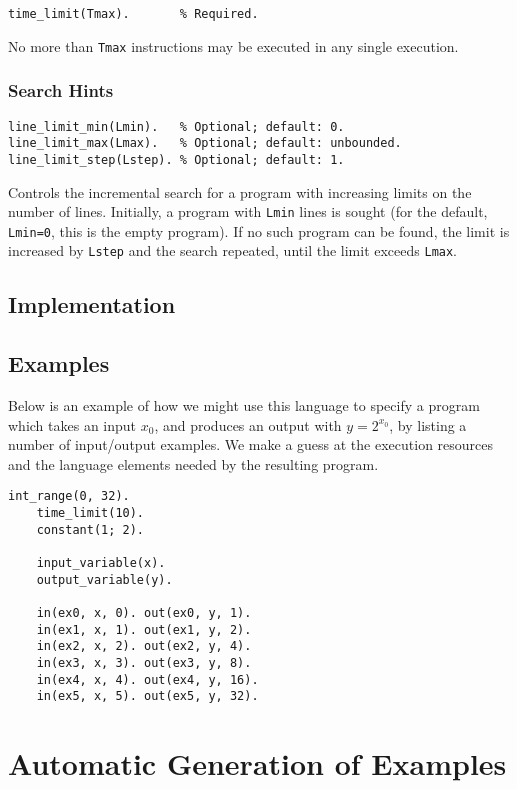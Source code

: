 \documentclass[a4paper,twoside,notitlepage]{report}
\newcommand{\ttt}{\texttt}
\begin{document}
\begin{Verbatim}[samepage=true]
time_limit(Tmax).       % Required.
\end{Verbatim}
No more than \ttt{Tmax} instructions may be executed in any single execution.

\subsection{Search Hints}
\begin{Verbatim}[samepage=true]
line_limit_min(Lmin).   % Optional; default: 0.
line_limit_max(Lmax).   % Optional; default: unbounded.
line_limit_step(Lstep). % Optional; default: 1.
\end{Verbatim}
Controls the incremental search for a program with increasing limits on 
the number of lines. Initially, a program with \ttt{Lmin} lines is sought 
(for the default, \verb|Lmin=0|, this is the empty program). If no such 
program can be found, the limit is increased by \ttt{Lstep} and the search 
repeated, until the limit exceeds \ttt{Lmax}.

\section{Implementation}


\section{Examples}
Below is an example of how we might use this language to specify a program 
which takes an input $x_0$, and produces an output with $y = 2^{x_0}$, by 
listing a number of input/output examples. We make a guess at the 
execution resources and the language elements needed by the resulting 
program.

\begin{Verbatim}[samepage=true]
    int_range(0, 32).
    time_limit(10).
    constant(1; 2).

    input_variable(x).
    output_variable(y).

    in(ex0, x, 0). out(ex0, y, 1).
    in(ex1, x, 1). out(ex1, y, 2).
    in(ex2, x, 2). out(ex2, y, 4).
    in(ex3, x, 3). out(ex3, y, 8).
    in(ex4, x, 4). out(ex4, y, 16).
    in(ex5, x, 5). out(ex5, y, 32).
\end{Verbatim}

\chapter{Automatic Generation of Examples} \label{chp:genexm}
\end{document}
